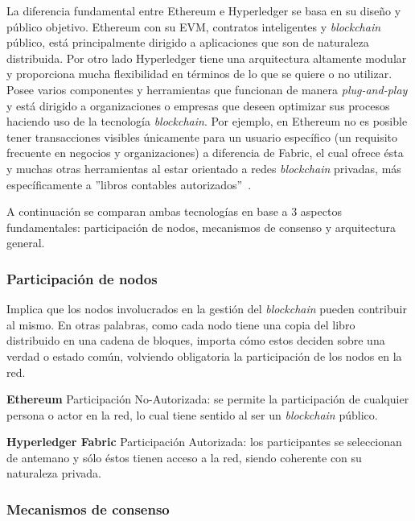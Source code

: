 La diferencia fundamental entre Ethereum e Hyperledger se basa en su diseño y público objetivo. Ethereum con su EVM, contratos inteligentes y {\it blockchain} público, está principalmente dirigido a aplicaciones que son de naturaleza distribuida. Por otro lado Hyperledger tiene una arquitectura altamente modular y proporciona mucha flexibilidad en términos de lo que se quiere o no utilizar. Posee varios componentes y herramientas que funcionan de manera \textit{plug-and-play} y está dirigido a organizaciones o empresas que deseen optimizar sus procesos haciendo uso de la tecnología \textit{blockchain}. Por ejemplo, en Ethereum no es posible tener transacciones visibles únicamente para un usuario específico (un requisito frecuente en negocios y organizaciones) a diferencia de Fabric, el cual ofrece ésta y muchas otras herramientas al estar orientado a redes \textit{blockchain} privadas, más específicamente a ''libros contables autorizados''~\cite{blockchaintrainingalliance}.

A continuación se comparan ambas tecnologías en base a 3 aspectos fundamentales: participación de nodos, mecanismos de consenso y arquitectura general.

\subsubsection{Participación de nodos}
Implica que los nodos involucrados en la gestión del \textit{blockchain} pueden contribuir al mismo. En otras palabras, como cada nodo tiene una copia del libro distribuido en una cadena de bloques, importa cómo estos deciden sobre una verdad o estado común, volviendo obligatoria la participación de los nodos en la red.

\noindent
\textbf{Ethereum} \newline
Participación No-Autorizada: se permite la participación de cualquier persona o actor en la red, lo cual tiene sentido al ser un \textit{blockchain} público.

\textbf{Hyperledger Fabric} \newline
Participación Autorizada: los participantes se seleccionan de antemano y sólo éstos tienen acceso a la red, siendo coherente con su naturaleza privada.

\subsubsection{Mecanismos de consenso}

